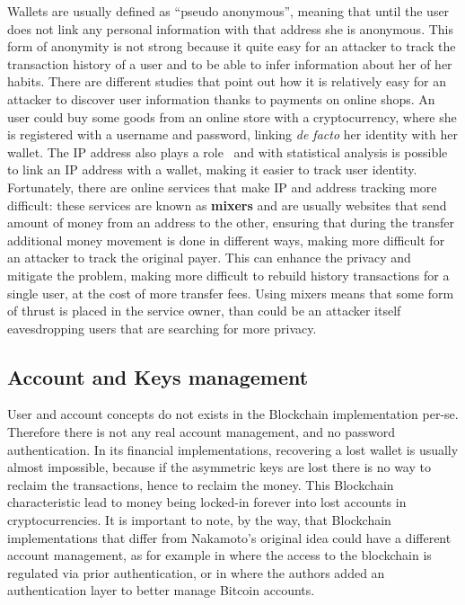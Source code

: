 Wallets are usually defined as ``pseudo anonymous'', meaning that until the
user does not link any personal information with that address she is anonymous.
This form of anonymity is not strong because it quite easy for an attacker to
track the transaction history of a user and to be able to infer information
about her of her habits.
There are different studies \cite{guadamuz15} that point out how it is
relatively easy for an attacker to discover user information thanks
to payments on online shops. An user could buy some goods from an online store
with a cryptocurrency, where she is registered with a username and password,
linking \textit{de facto} her identity with her wallet.
The IP address also plays a role~\cite{koshy14} and with statistical analysis
is possible to link an IP address with a wallet, making it easier to track user
identity.
Fortunately, there are online services that make IP and address tracking more
difficult: these services are known as \textbf{mixers} and are usually websites
that send amount of money from an address to the other, ensuring that during the
transfer additional money movement is done in different ways, making more
difficult for an attacker to track the original payer. This can enhance the
privacy and mitigate the problem, making more difficult to rebuild history
transactions for a single user, at the cost of more transfer fees. Using mixers
means that some form of thrust is placed in the service owner, than could be an
attacker itself eavesdropping users that are searching for more privacy.

\subsection{Account and Keys management}

User and account concepts do not exists in the Blockchain implementation per-se.
Therefore there is not any real account management, and no password
authentication. In its financial implementations, recovering a lost wallet is
usually almost impossible, because if the asymmetric keys are lost there is no
way to reclaim the transactions, hence to reclaim the money. This Blockchain
characteristic lead to money being locked-in forever into lost accounts in
cryptocurrencies.
It is important to note, by the way, that Blockchain implementations that differ
from Nakamoto's original idea could have a different account management, as for
example in\cite{azaria16} where the access to the blockchain is regulated via
prior authentication, or in\cite{zhou16} where the authors added an
authentication layer to better manage Bitcoin accounts.

